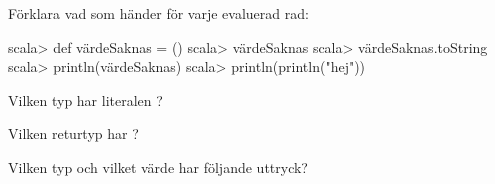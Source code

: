 \Subtask Förklara vad som händer för varje evaluerad rad:
\begin{REPL}
scala> def värdeSaknas = ()
scala> värdeSaknas
scala> värdeSaknas.toString
scala> println(värdeSaknas)
scala> println(println("hej"))
\end{REPL}

\Subtask Vilken typ har literalen \code{()}?

\Subtask Vilken returtyp har ?

\Task Vilken typ och vilket värde har följande uttryck?  %

\Subtask {}

\Subtask {}

\Subtask {}

\Subtask {}

\Subtask {}

\Subtask {}

\Subtask {}

\Subtask {}

\Subtask {}

\Subtask \linebreak[0] 

\Subtask {}

\Subtask {}

\Subtask {}

\Subtask {}

